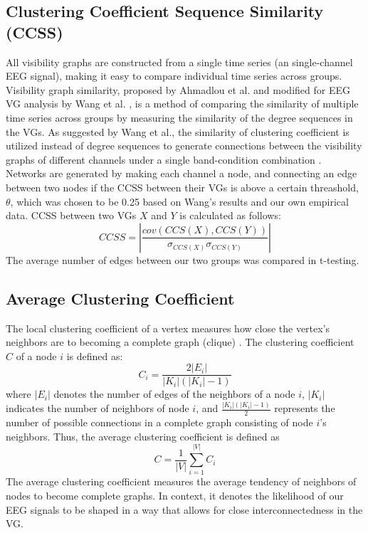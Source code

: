 \documentclass[Afour,times,sageh]{sagej}
\begin{document}
\subsection{Clustering Coefficient Sequence Similarity (CCSS)}
All visibility graphs are constructed from a single time series (an single-channel EEG signal), making it easy to compare individual time series across groups. Visibility graph similarity, proposed by Ahmadlou et al. \citep{Ahmadlou2012} and modified for EEG VG analysis by Wang et al. \citep{Wang2016}, is a method of comparing the similarity of multiple time series across groups by measuring the similarity of the degree sequences in the VGs. As suggested by Wang et al., the similarity of clustering coefficient is utilized instead of degree sequences to generate connections between the visibility graphs of different channels under a single band-condition combination \citep{Wang2016}. Networks are generated by making each channel a node, and connecting an edge between two nodes if the CCSS between their VGs is above a certain threashold, $\theta$, which was chosen to be 0.25 based on Wang's results and our own empirical data. CCSS between two VGs $X$ and $Y$ is calculated as follows: $$CCSS = |\frac{cov(CCS(X), CCS(Y))}{\sigma_{CCS(X)} \sigma_{CCS(Y)}}|$$ The average number of edges between our two groups was compared in t-testing.
\subsection{Average Clustering Coefficient}
The local clustering coefficient of a vertex measures how close the vertex's neighbors are to becoming a complete graph (clique) \citep{Watts}. The clustering coefficient $C$ of a node $i$ is defined as:  $$C_i = \frac{2|E_i|}{|K_i|(|K_i| - 1)}$$where $|E_i|$ denotes the number of edges of the neighbors of a node $i$, $|K_i|$ indicates the number of neighbors of node $i$, and $\frac{|K_i|(|K_i| - 1)}{2}$ represents the number of possible connections in a complete graph consisting of node $i$'s neighbors. Thus, the average clustering coefficient is defined as $$C = \frac{1}{|V|} \sum_{i=1}^{|V|} C_i$$ The average clustering coefficient measures the average tendency of neighbors of nodes to become complete graphs. In context, it denotes the likelihood of our EEG signals to be shaped in a way that allows for close interconnectedness in the VG.
\end{document}

